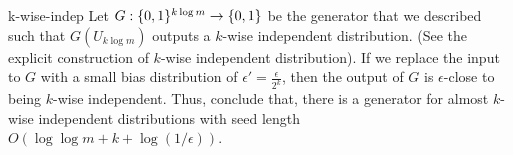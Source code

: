 \begin{exercise-prob}
\begin{show-ps4}{k-wise-indep}
Let $G : \{0,1\}^{k \log m} \to \{0,1\}$ be the generator that we described such that $G\left(U_{k \log m}\right)$ outputs a $k$-wise independent distribution. (See the explicit construction of $k$-wise independent distribution). If we replace the input to $G$ with a small bias distribution of $\epsilon' = \frac{\epsilon}{2^k}$, then the output of $G$ is $\epsilon$-close to being $k$-wise independent. Thus, conclude that, there is a generator for almost $k$-wise independent distributions with seed length $O\left(\log\log m+k+\log(1/\epsilon)\right)$.
\end{show-ps4}
\end{exercise-prob}

